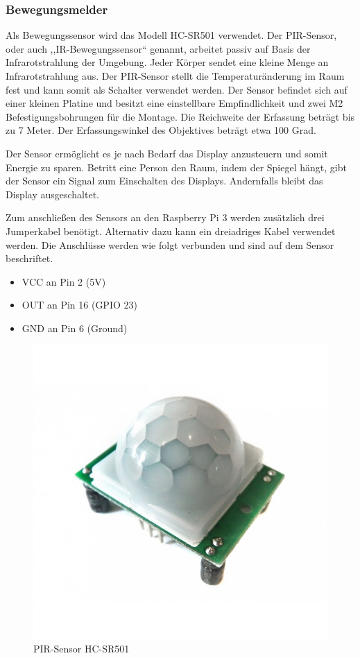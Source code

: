\subsubsection{Bewegungsmelder}
Als Bewegungssensor wird das Modell HC-SR501 verwendet. Der PIR-Sensor, oder auch ,,IR-Bewegungssensor`` genannt, arbeitet passiv auf Basis der Infrarotstrahlung der Umgebung.  Jeder Körper sendet eine kleine Menge an Infrarotstrahlung aus. Der PIR-Sensor stellt die Temperaturänderung im Raum fest und kann somit als Schalter verwendet werden. Der Sensor befindet sich auf einer kleinen Platine und besitzt eine einstellbare Empfindlichkeit und zwei M2 Befestigungsbohrungen für die Montage. Die Reichweite der Erfassung beträgt bis zu 7 Meter. Der Erfassungswinkel des Objektives beträgt etwa 100 Grad. 

Der Sensor ermöglicht es je nach Bedarf das Display anzusteuern und somit Energie zu sparen. Betritt eine Person den Raum, indem der Spiegel hängt, gibt der Sensor ein Signal zum Einschalten des Displays. Andernfalls bleibt das Display ausgeschaltet. 

Zum anschließen des Sensors an den Raspberry Pi 3 werden zusätzlich drei Jumperkabel benötigt. Alternativ dazu kann ein dreiadriges Kabel verwendet werden. Die Anschlüsse werden wie folgt verbunden und sind auf dem Sensor beschriftet. 
\begin{center}
	\begin{singlespace}
		\begin{itemize}
			\item VCC an Pin 2 (5V)
			\item OUT an Pin 16 (GPIO 23)
			\item GND an Pin 6 (Ground)
		\end{itemize}
	\end{singlespace}
\end{center} 
\begin{figure}[H]
	\includegraphics[trim=20mm 20mm 20mm 20mm, scale=0.2]{bilder/PIR-Sensor.jpg}
	\caption{PIR-Sensor HC-SR501}
\end{figure}


